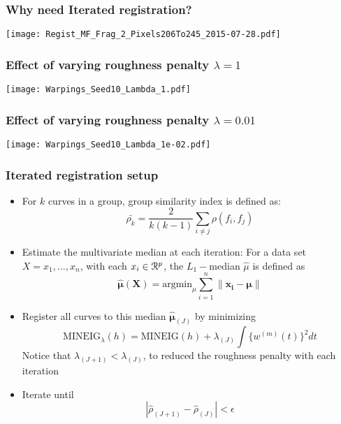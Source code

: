 \documentclass[10pt,dvipsnames,table, notes]{beamer}
\begin{document}
\begin{frame}
\frametitle{Why need Iterated registration?}
\begin{center}
\texttt{[image: Regist\_MF\_Frag\_2\_Pixels206To245\_2015-07-28.pdf]}
\end{center}

\end{frame}

\begin{frame}
\frametitle{Effect of varying roughness penalty $\lambda = 1$}
\begin{center}
\colorbox{white}{\texttt{[image: Warpings\_Seed10\_Lambda\_1.pdf]}}
\end{center}
\end{frame}

\begin{frame}
\frametitle{Effect of varying roughness penalty $\lambda = 0.01$}
\begin{center}
\colorbox{white}{\texttt{[image: Warpings\_Seed10\_Lambda\_1e-02.pdf]}}
\end{center}
\end{frame}

\begin{frame}
\frametitle{Iterated registration setup}
\begin{itemize}
\item For $k$ curves in a group, group similarity index is defined as:
\[ \bar{\rho_k} = \frac{2}{k(k-1)}\sum \limits_{i \ne j} \rho(f_i, f_j)\] 

\pause \item Estimate the multivariate median at each iteration: For a data set $X = {x_1, \dots, x_n}$, with each $x_i \in \mathcal{R}^p$, the $L_1-$median $\hat{\mu}$ is defined as 
\[ \hat{\boldsymbol{\mu}}(\mathbf{X}) = \text{argmin}_{\mu} \sum\limits_{i = 1}^{n}\|\mathbf{x_i} - \boldsymbol{\mu} \|\]

\pause \item Register all curves to this median $\hat{\boldsymbol{\mu}}_{(J)}$ by minimizing
\[ \text{MINEIG}_{\lambda}(h) = \text{MINEIG}(h) + \lambda_{(J)} \int \{w^{(m)}(t)\}^2 dt \]
Notice that $\lambda_{(J+1)} < \lambda_{(J)}$, to reduced the roughness penalty with each iteration

\pause \item Iterate until 
\[ |\hat{\rho}_{(J+1)} - \hat{\rho}_{(J)}| < \epsilon \]
\end{itemize}
\end{frame}
\end{document}
